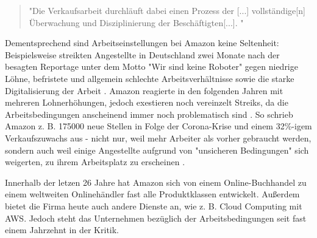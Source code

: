 \begin{quote}
    "Die Verkaufsarbeit durchläuft dabei einen Prozess der [...] vollständige[n] Überwachung und Disziplinierung der Beschäftigten[...]. \cite[S. 29]{Apicella}"
\end{quote}
Dementsprechend sind Arbeitseinstellungen bei Amazon keine Seltenheit: Beispielsweise streikten Angestellte in Deutschland zwei Monate nach der besagten Reportage unter dem Motto "Wir sind keine Roboter" gegen niedrige Löhne, befristete und allgemein schlechte Arbeitsverhältnisse sowie die starke Digitalisierung der Arbeit \cite[S. 6]{Apicella}. Amazon reagierte in den folgenden Jahren mit mehreren Lohnerhöhungen, jedoch exestieren noch vereinzelt Streiks, da die Arbeitsbedingungen anscheinend immer noch problematisch sind \cite{JGraf}. So schrieb Amazon z. B. 175000 neue Stellen in Folge der Corona-Krise und einem 32\%-igem Verkaufszuwachs aus - nicht nur, weil mehr Arbeiter als vorher gebraucht werden, sondern auch weil einige Angestellte aufgrund von "unsicheren Bedingungen" sich weigerten, zu ihrem Arbeitsplatz zu erscheinen \cite{Theweek}.

Innerhalb der letzen 26 Jahre hat Amazon sich von einem Online-Buchhandel zu einem weltweiten Onlinehändler fast alle Produktklassen entwickelt. Außerdem bietet die Firma heute auch andere Dienste an, wie z. B. Cloud Computing mit \ac{AWS}. Jedoch steht das Unternehmen bezüglich der Arbeitsbedingungen seit fast einem Jahrzehnt in der Kritik.
